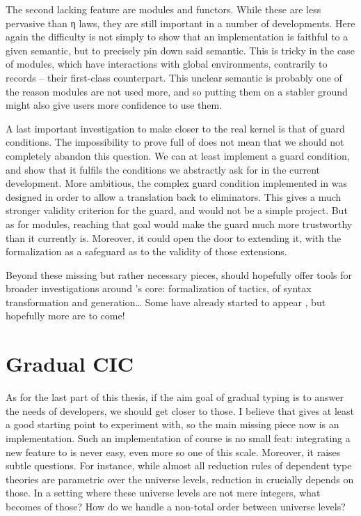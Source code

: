 The second lacking feature are modules and functors.
While these are less pervasive than η laws, they are still important in a number of developments.
Here again the difficulty is not simply to show that an implementation is faithful to a given
semantic, but to precisely pin down said semantic. This is tricky in the case of modules, which
have interactions with global environments, contrarily to records – their first-class counterpart.
This unclear semantic is probably one of the reason modules are not used more, and so putting
them on a stabler ground might also give users more confidence to use them.

A last important investigation to make  closer to the real kernel is that of
guard conditions. The impossibility to prove full  of 
does not mean that we should not completely abandon this question. We
can at least implement a guard condition,
and show that it fulfils the conditions we abstractly ask for
in the current development. More ambitious, the complex guard condition implemented in 
was designed  in order to allow a translation back to eliminators.
This gives a much stronger validity criterion for the guard, and would not be a simple project.
But as for modules, reaching
that goal would make the guard much more trustworthy than it currently is. Moreover,
it could open the door to extending it, with the formalization
as a safeguard as to the validity of those extensions.

Beyond these missing but rather necessary pieces,
 should hopefully offer tools for
broader investigations around ’s core: formalization of tactics,
of syntax transformation and generation… Some have already started to appear
, but hopefully more are to come!

\section{Gradual CIC}

As for the last part of this thesis, if the aim goal of gradual typing
is to answer the needs of developers, we should get closer to those.
I believe that  gives at least a good starting point to experiment with,
so the main missing piece now is an implementation.
Such an implementation of course is no small feat: integrating a new feature to  is
never easy, even more so one of this scale.
Moreover, it raises subtle questions. For instance, while almost all reduction rules of
dependent type theories are parametric over the universe levels,
reduction in  crucially depends on those.
In a setting where these universe levels are not mere integers,
what becomes of those? How do we handle a non-total order between universe levels?